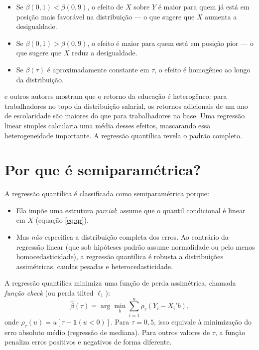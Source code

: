 \begin{itemize}
  \item Se $\beta(0{,}1) < \beta(0{,}9)$, o efeito de $X$ sobre $Y$ é maior para
  quem já está em posição mais favorável na distribuição — o que sugere que $X$
  aumenta a desigualdade.
  \item Se $\beta(0{,}1) > \beta(0{,}9)$, o efeito é maior para quem está em posição
  pior — o que sugere que $X$ reduz a desigualdade.
  \item Se $\beta(\tau)$ é aproximadamente constante em $\tau$, o efeito é homogêneo
  ao longo da distribuição.
\end{itemize}

\begin{exemplobox}
\citet{angrist_quantile_2006} e outros autores mostram que o retorno da educação é
heterogêneo: para trabalhadores no topo da distribuição salarial, os retornos adicionais
de um ano de escolaridade são maiores do que para trabalhadores na base. Uma regressão
linear simples calcularia uma média desses efeitos, mascarando essa heterogeneidade
importante. A regressão quantílica revela o padrão completo.
\end{exemplobox}

\section*{Por que é semiparamétrica?}

A regressão quantílica é classificada como semiparamétrica porque:

\begin{itemize}
  \item Ela impõe uma estrutura \emph{parcial}: assume que o quantil condicional é
  linear em $X$ (equação \ref{eq:qr}).
  \item Mas \emph{não} especifica a distribuição completa dos erros. Ao contrário da
  regressão linear (que sob hipóteses padrão assume normalidade ou pelo menos
  homocedasticidade), a regressão quantílica é robusta a distribuições assimétricas,
  caudas pesadas e heterocedasticidade.
\end{itemize}

\begin{notatecnica}
A regressão quantílica minimiza uma função de perda assimétrica, chamada \emph{função
check} (ou perda tilted $\ell_1$):
\[
\hat{\beta}(\tau) = \arg\min_b \sum_{i=1}^n \rho_\tau(Y_i - X_i' b),
\]
onde $\rho_\tau(u) = u[\tau - \mathbf{1}(u < 0)]$. Para $\tau = 0{,}5$, isso equivale
à minimização do erro absoluto médio (regressão de mediana). Para outros valores de
$\tau$, a função penaliza erros positivos e negativos de forma diferente.
\end{notatecnica}

